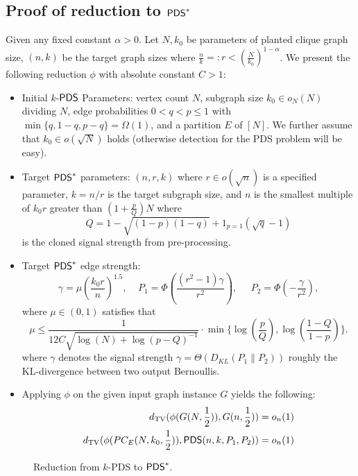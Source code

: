 \documentclass[final,12pt]{colt2023} %
\newcommand\1[1]{\mathbb{I}_{\left\{#1\right\}}}
\begin{document}
\subsection{Proof of reduction to $\mathsf{PDS}^*$}
\begin{theorem} \label{PDSreduction}
Given any fixed constant $\alpha>0$. Let $N, k_0$ be parameters of planted clique graph size, $(n, k)$ be the target graph sizes where $\frac{n}{k}=:r<\left(\frac{N}{k_0}\right)^{1-\alpha}$.  We present the following reduction $\phi$ with absolute constant $C>1$:
\begin{itemize}
    \item \textup{Initial $k$-$\mathsf{PDS}$ Parameters:} vertex count $N$, subgraph size $k_0\in o_N(N)$ dividing $N$, edge probabilities $0 < q < p \leq 1$ with $\min\{q, 1 - q, p-q\} = \Omega(1)$, and a partition $E$ of $[N]$. We further assume that $k_0\in o(\sqrt{N})$ holds (otherwise detection for the PDS problem will be easy).

    \item \textup{Target $\mathsf{PDS}^*$ parameters:} $(n, r, k)$ where $r\in o(\sqrt{n})$ is a specified parameter, $k=n/r$ is the target subgraph size, and $n$ is the smallest multiple of $k_0r$ greater than $(1+\frac{p}{Q})N$ where $$Q=1-\sqrt{(1-p)(1-q)}+1_{p=1}(\sqrt{q}-1)$$is the cloned signal strength from pre-processing.
    
    \item \textup{Target $\mathsf{PDS}^*$ edge strength:}
    $$\gamma=\mu(\frac{k_0r}{n})^{1.5},\;\;\;\;P_1=\Phi(\frac{(r^2-1)\gamma}{r^2}),\;\;\;\;\; P_2=\Phi(-\frac{\gamma}{r^2}),$$
    where $\mu\in(0, 1)$ satisfies that$$\mu\leq\frac{1}{12C\sqrt{\log(N)+\log(p-Q)^{-1}}}\cdot\min\{\log(\frac{p}{Q}), \log(\frac{1-Q}{1-p})\}.$$
    where $\gamma$ denotes the signal strength $\gamma=\Theta(D_{KL}(P_1\|P_2))$ roughly the KL-divergence between two output Bernoullis.
    \item Applying $\phi$ on the given input graph instance $G$  yields the following:
    \begin{align*}
        d_{\rm TV}(\phi(G(N,\frac{1}{2})), G(n, \frac{1}{2}))&=o_n(1)\\
        d_{\rm TV}(\phi(PC_{E}(N, k_0, \frac{1}{2})), \mathsf{PDS}(n, k, P_1, P_2))&=o_n(1)
    \end{align*}
\end{itemize}
\end{theorem}
\begin{figure}
    
    \vspace{-5mm}
    \caption{\footnotesize Reduction from $k$-PDS to $\mathsf{PDS}^*$.}
    \label{fig: pdsred}
\end{figure}
\end{document}
